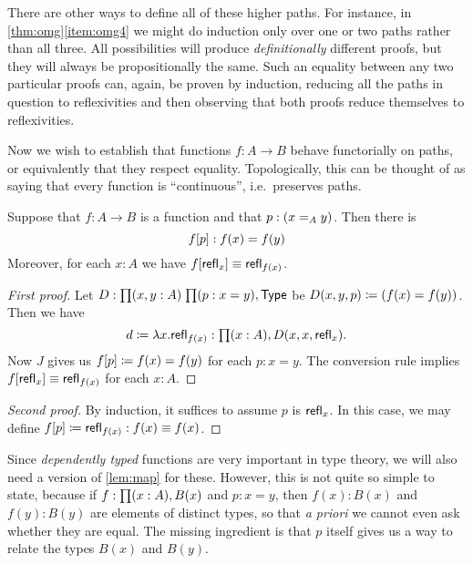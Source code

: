 \begin{rmk}
  There are other ways to define all of these higher paths.
  For instance, in \autoref{thm:omg}\ref{item:omg4} we might do induction only over one or two paths rather than all three.
  All possibilities will produce \emph{definitionally} different proofs, but they will always be propositionally the same.
  Such an equality between any two particular proofs can, again, be proven by induction, reducing all the paths in question to reflexivities and then observing that both proofs reduce themselves to reflexivities.
\end{rmk}

Now we wish to establish that functions $f:A\to B$ behave functorially on paths, or equivalently that they respect equality.
Topologically, this can be thought of as saying that every function is ``continuous'', i.e.\ preserves paths.

\begin{lem}\label{lem:map}
  Suppose that $f:A\to B$ is a function and that $p:(\id[A]xy)$. Then there is
  \begin{equation*}
    \map f p : f(x)= f(y)
  \end{equation*}
  Moreover, for each $x:A$ we have $\map {f}{\refl{x}}\jdeq \refl{f(x)}$.
\end{lem}

\begin{proof}[First proof]
  Let $D:\prd{x,y:A}{p:x=y}\type$ be $D(x,y,p)\defeq (f(x)= f(y))$.
  Then we have
  \begin{equation*}
    d\defeq\lambda x.\refl{f(x)}:\prd{x:A} D(x,x,\refl{x}).
  \end{equation*}
  Now $J$ gives us $\map f p\defeq f(x)= f(y)$ for each $p:x= y$.
  The conversion rule implies $\map f{\refl{x}}\jdeq\refl{f(x)}$ for each $x:A$.
\end{proof}

\begin{proof}[Second proof]
  By induction, it suffices to assume $p$ is $\refl{x}$.
  In this case, we may define $\map f p \defeq \refl{f(x)}:f(x)\jdeq f(x)$.
\end{proof}

Since \emph{dependently typed} functions are very important in type theory, we will also need a version of \autoref{lem:map} for these.
However, this is not quite so simple to state, because if $f:\prd{x:A} B(x)$ and $p:x=y$, then $f(x):B(x)$ and $f(y):B(y)$ are elements of distinct types, so that \emph{a priori} we cannot even ask whether they are equal.
The missing ingredient is that $p$ itself gives us a way to relate the types $B(x)$ and $B(y)$.

